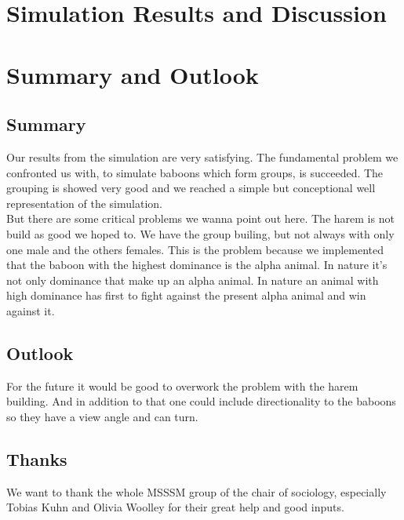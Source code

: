 \documentclass[11pt]{article}
\begin{document}
\section{Simulation Results and Discussion}


\section{Summary and Outlook}
\subsection{Summary}
\label{sec:Summary}
Our results from the simulation are very satisfying. The fundamental problem we confronted us with, to simulate baboons which form groups, is succeeded. The grouping is showed very good and we reached a simple but conceptional well representation of the simulation.\\
But there are some critical problems we wanna point out here. The harem is not build as good we hoped to. We have the group builing, but not always with only one male and the others females. This is the problem because we implemented that the baboon with the highest dominance is the alpha animal. In nature it's not only dominance that make up an alpha animal. In nature an animal with high dominance has first to fight against the present alpha animal and win against it.

\subsection{Outlook}
\label{sec:Outlook}
For the future it would be good to overwork the problem with the harem building. And in addition to that one could include directionality to the baboons so they have a view angle and can turn.

\subsection{Thanks}
We want to thank the whole MSSSM group of the chair of sociology, especially Tobias Kuhn and Olivia Woolley for their great help and good inputs.\\
\end{document}
